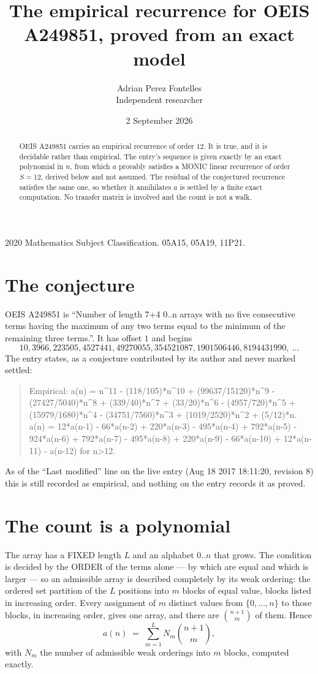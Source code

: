 \documentclass[11pt,a4paper]{article}
\title{The empirical recurrence for OEIS A249851, proved from an exact model}
\author{Adrian Perez Fontelles\\ \small Independent researcher}
\date{2 September 2026}
\theoremstyle{plain}
\theoremstyle{definition}
\begin{document}
\maketitle

\begin{abstract}
OEIS A249851 carries an empirical recurrence of order $12$. It is true, and it is
decidable rather than empirical. The entry's sequence is given exactly by an exact polynomial in $n$, from
which $a$ provably satisfies a MONIC linear recurrence of order $S=12$, derived below and not
assumed. The residual of the conjectured recurrence satisfies the same one, so whether it
annihilates $a$ is settled by a finite exact computation. No transfer matrix is involved and
the count is not a walk.
\end{abstract}

\noindent\small 2020 Mathematics Subject Classification. 05A15, 05A19, 11P21.\normalsize

\section{The conjecture}

OEIS A249851 is ``Number of length 7+4 0..n arrays with no five consecutive terms having the maximum of any two terms equal to the minimum of the remaining three terms.''. It has offset $1$ and begins
\[
10, 3966, 223505, 4527441, 49270055, 354521087, 1901506446, 8194431990,\ \dots
\]
The entry states, as a conjecture contributed by its author and never marked settled:
\begin{quote}
Empirical: a(n) = n\^{}11 - (118/105)*n\^{}10 + (99637/15120)*n\^{}9 - (27427/5040)*n\^{}8 + (339/40)*n\^{}7 + (33/20)*n\^{}6 - (4957/720)*n\^{}5 + (15979/1680)*n\^{}4 - (34751/7560)*n\^{}3 + (1019/2520)*n\^{}2 + (5/12)*n. a(n) = 12*a(n-1) - 66*a(n-2) + 220*a(n-3) - 495*a(n-4) + 792*a(n-5) - 924*a(n-6) + 792*a(n-7) - 495*a(n-8) + 220*a(n-9) - 66*a(n-10) + 12*a(n-11) - a(n-12) for n>12.
\end{quote}
As of the ``Last modified'' line on the live entry (Aug 18 2017 18:11:20, revision 8)
this is still recorded as empirical, and nothing on the entry records it as proved.

\section{The count is a polynomial}

The array has a FIXED length $L$ and an alphabet $0..n$ that grows. The condition is decided by
the ORDER of the terms alone --- by which are equal and which is larger --- so an admissible
array is described completely by its weak ordering: the ordered set partition of the $L$
positions into $m$ blocks of equal value, blocks listed in increasing order. Every assignment
of $m$ distinct values from $\{0,\dots,n\}$ to those blocks, in increasing order, gives one
array, and there are $\binom{n+1}{m}$ of them. Hence
\[
a(n)\;=\;\sum_{m=1}^{L} N_m\binom{n+1}{m},
\]
with $N_m$ the number of admissible weak orderings into $m$ blocks, computed exactly.
\end{document}
